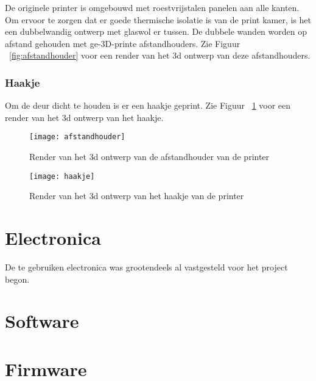 De originele printer is omgebouwd met roestvrijstalen panelen aan alle kanten.
Om ervoor te zorgen dat er goede thermische isolatie is van de print kamer, is
het een dubbelwandig ontwerp met glaswol er tussen. De dubbele wanden worden op
afstand gehouden met ge-3D-printe afstandhouders. Zie Figuur
~\ref{fig:afstandhouder} voor een render van het \ac{3d} ontwerp van deze
afstandhouders.

\subsubsection{Haakje}

Om de deur dicht te houden is er een haakje geprint. Zie Figuur
~\ref{fig:haakje} voor een render van het \ac{3d} ontwerp van het haakje.

\begin{figure}[h]
    \centering
    \begin{minipage}{0.45\textwidth}
        \centerline{\texttt{[image: afstandhouder]}}
        \caption{Render van het \ac{3d} ontwerp van de afstandhouder van de printer}
        \label{fig:afstandhouder}
    \end{minipage}\hfill
    \begin{minipage}{0.45\textwidth}
        \centerline{\texttt{[image: haakje]}}
        \caption{Render van het \ac{3d} ontwerp van het haakje van de printer}
        \label{fig:haakje}
    \end{minipage}
\end{figure}

\section{Electronica}

De te gebruiken electronica was grootendeels al vastgesteld voor het project begon.

\section{Software}

\section{Firmware}



